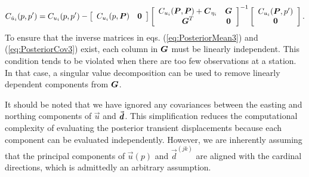 \documentclass[extra,mreferee]{gji}
\begin{document}
\begin{equation}\label{eq:PosteriorCov3}
C_{\post_i}(p,p') = C_{u_i}(p,p') - 
                    \left[\begin{array}{cc}
                          C_{u_i}(p,\points) & \zeros \\
                          \end{array}\right]
                    \left[\begin{array}{cc}
                          C_{u_i}(\points,\points) + \mitbf{C}_{\eta_i} & \G \\
                          \G^T  & \zeros \\
                          \end{array}\right]^{-1}
                    \left[\begin{array}{c}
                          C_{u_i}(\points,p') \\
                          \zeros \\
                          \end{array}\right].
\end{equation}
To ensure that the inverse matrices in eqs. (\ref{eq:PosteriorMean3})
and (\ref{eq:PosteriorCov3}) exist, each column in $\G$ must be
linearly independent. This condition tends to be violated when there
are too few observations at a station. In that case, a singular value
decomposition can be used to remove linearly dependent components from
$\G$.


It should be noted that we have ignored any covariances between the
easting and northing components of $\vec{u}$ and $\vec{\data}$. This
simplification reduces the computational complexity of evaluating the
posterior transient displacements because each component can be
evaluated independently. However, we are inherently assuming that the
principal components of $\vec{u}(p)$ and $\vec{d}^{(jk)}$ are aligned
with the cardinal directions, which is admittedly an arbitrary
assumption.

\end{document}

